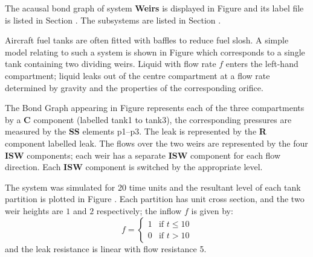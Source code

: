 
%

   The acausal bond graph of system \textbf{Weirs} is
   displayed in Figure  and its label
   file is listed in Section .
   The subsystems are listed in Section .


Aircraft fuel tanks are often fitted with baffles to reduce fuel
slosh. A simple model relating to such a system is shown in Figure
 which corresponds to a single tank containing two
dividing weirs. Liquid with flow rate $f$ enters the left-hand
compartment; liquid leaks out of the centre compartment at a flow rate
determined by gravity and the properties of the corresponding orifice.

The Bond Graph appearing in Figure  represents each of
the three compartments by a \textbf{C} component (labelled tank1 to
tank3), the corresponding pressures are measured by the \textbf{SS}
elements p1--p3. The leak is represented by the \textbf{R} component
labelled leak. The flows over the two weirs are represented by the four
\textbf{ISW} components; each weir has a separate \textbf{ISW}
component for each flow direction. Each \textbf{ISW} component is
switched by the appropriate level.


The system was simulated for 20 time units and the resultant level of
each tank partition is plotted in Figure . Each
partition has unit cross section, and the two weir heights are $1$ and
$2$ respectively; the inflow $f$ is given by:
\begin{equation}
  f = 
  \begin{cases}
    1 & \text{if $t \le 10$}\\
    0 & \text{if $t > 10$}
  \end{cases}
\end{equation}
and the leak resistance is linear with flow resistance 5.


